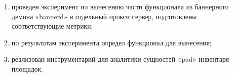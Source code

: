 \begin{enumerate}
	\item проведен эксперимент по вынесению части функционала из баннерного демона «bannerd» в отдельный прокси сервер, подготовлены соответствующие метрики;
	\item по результатам эксперимента определ  функционал для вынесения;
	\item реализован инструментарий для аналитики сущностей «pad» инвентаря площадок.
\end{enumerate}



\begingroup
\renewcommand{\section}[2]{}

   
\endgroup


